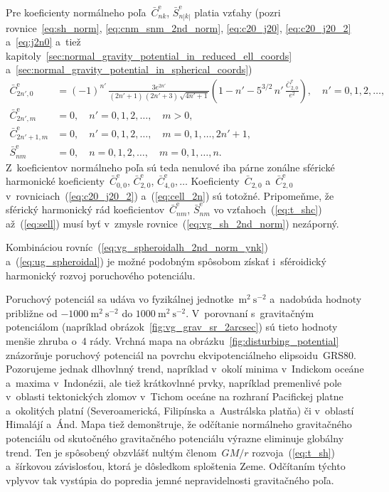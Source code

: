 \documentclass[a4paper, 12pt]{book}
\begin{document}
%
Pre koeficienty normálneho poľa~$\bar{C}_{nk}^{\mathrm{e}}$, 
$\bar{S}_{n|k|}^{\mathrm{e}}$ platia vzťahy (pozri rovnice~\ref{eq:sh_norm}, 
\ref{eq:cnm_snm_2nd_norm}, \ref{eq:c20_j20}, \ref{eq:c20_j20_2} a~\ref{eq:j2n0} 
a~tiež kapitoly~\ref{sec:normal_gravity_potential_in_reduced_ell_coords} 
a~\ref{sec:normal_gravity_potential_in_spherical_coords})
%
\begin{align}
\label{eq:cell_2n}
\bar{C}^\mathrm{e}_{2n',0} &= (-1)^{n'} \, \frac{3e^{2n'}}{(2n' + 1) \, (2n' 
+ 3) \, \sqrt{4n' + 1}} \left( 1 - n' - 5^{3 \slash 2} \, n' \, 
\frac{\bar{C}^\mathrm{e}_{2,0}}{e^2} \right){,} \quad n' = 0, 1, 2,\dots{,}\\
%
\bar{C}^\mathrm{e}_{2n', m} &= 0{,} \quad n' = 0, 1, 2,\dots{,} \quad 
m > 0{,}\\
%
\bar{C}^\mathrm{e}_{2n' + 1, m} &= 0{,} \quad n' = 0, 1, 2,\dots{,} \quad 
m = 0, 1, \dots, 2n' + 1{,}\\
%
\label{eq:sell}
\bar{S}^\mathrm{e}_{nm} &= 0{,} \quad n = 0, 1, 2,\dots, \quad m = 0, 1, \dots, 
n{.}
\end{align}
%
Z~koeficientov normálneho poľa sú teda nenulové iba párne zonálne sférické 
harmonické koeficienty~$\bar{C}^{\mathrm{e}}_{0,0}$, 
$\bar{C}^{\mathrm{e}}_{2,0}$, $\bar{C}^{\mathrm{e}}_{4,0}, \dots 
$ Koeficienty~$\bar{C}_{2,0}$ a~$\bar{C}_{2,0}^\mathrm{e}$ 
v~rovniciach~(\ref{eq:c20_j20_2}) a~(\ref{eq:cell_2n}) sú totožné.  Pripomeňme, 
že sférický harmonický rád koeficientov~$\bar{C}_{nm}^{\mathrm{e}}$, 
$\bar{S}_{nm}^{\mathrm{e}}$ vo vzťahoch~(\ref{eq:t_shc}) až~(\ref{eq:sell}) 
musí byť v~zmysle rovnice~(\ref{eq:vg_sh_2nd_norm}) nezáporný.

Kombináciou rovníc~(\ref{eq:vg_spheroidalh_2nd_norm_ynk}) 
a~(\ref{eq:ug_spheroidal}) je možné podobným spôsobom získať i~sféroidický 
harmonický rozvoj poruchového potenciálu.

Poruchový potenciál sa udáva vo fyzikálnej jednotke~$\mathrm{m}^2 
\ \mathrm{s}^{-2}$ a~nadobúda hodnoty približne od $-1000\ \mathrm{m}^2 
\ \mathrm{s}^{-2}$ do $1000 \ \mathrm{m}^2 \ \mathrm{s}^{-2}$.  V~porovnaní 
s~gravitačným potenciálom (napríklad obrázok~\ref{fig:vg_grav_sr_2arcsec}) sú 
tieto hodnoty menšie zhruba o~4 rády.  Vrchná mapa na 
obrázku~\ref{fig:disturbing_potential} znázorňuje poruchový potenciál na 
povrchu ekvipotenciálneho elipsoidu~GRS80.  Pozorujeme jednak dlhovlnný trend, 
napríklad v~okolí minima v~Indickom oceáne a~maxima v~Indonézii, ale tiež 
krátkovlnné prvky, napríklad premenlivé pole v~oblasti tektonických zlomov 
v~Tichom oceáne na rozhraní Pacifickej platne a~okolitých platní 
(Severoamerická, Filipínska a~Austrálska platňa) či v~oblastí Himalájí a~Ánd.  
Mapa tiež demonštruje, že odčítanie normálneho gravitačného potenciálu od 
skutočného gravitačného potenciálu výrazne eliminuje globálny trend.  Ten je 
spôsobený obzvlášť nultým členom~$GM \slash r$ rozvoja~(\ref{eq:t_sh}) 
a~šírkovou závislosťou, ktorá je dôsledkom sploštenia Zeme.  Odčítaním týchto 
vplyvov tak vystúpia do popredia jemné nepravidelnosti gravitačného poľa.
\end{document}
